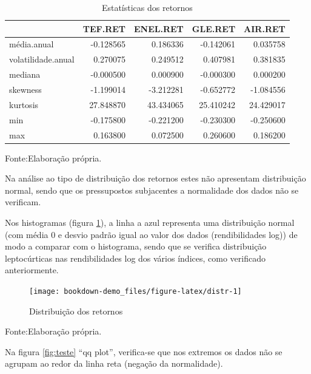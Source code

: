 \documentclass[
  12pt,
  a4paper,
  openany]{book}
\begin{document}
\normalsize

\begin{table}[!h]

\caption{\label{tab:statret}Estatísticas dos retornos}
\centering
\begin{tabular}[t]{lrrrr}
\toprule
  & TEF.RET & ENEL.RET & GLE.RET & AIR.RET\\
\midrule
média.anual & -0.128565 & 0.186336 & -0.142061 & 0.035758\\
volatilidade.anual & 0.270075 & 0.249512 & 0.407981 & 0.381835\\
mediana & -0.000500 & 0.000900 & -0.000300 & 0.000200\\
skewness & -1.199014 & -3.212281 & -0.652772 & -1.084556\\
kurtosis & 27.848870 & 43.434065 & 25.410242 & 24.429017\\
\addlinespace
min & -0.175800 & -0.221200 & -0.230300 & -0.250600\\
max & 0.163800 & 0.072500 & 0.260600 & 0.186200\\
\bottomrule
\end{tabular}
\end{table}
\FloatBarrier
\centering

Fonte:Elaboração própria.

\justifying
\bigskip

Na análise ao tipo de distribuição dos retornos estes não apresentam distribuição normal, sendo que os pressupostos subjacentes a normalidade dos dados não se verificam.

Nos histogramas (figura \ref{fig:distr}), a linha a azul representa uma distribuição normal (com média 0 e desvio padrão igual ao valor dos dados (rendibilidades log)) de modo a comparar com o histograma, sendo que se verifica distribuição leptocúrticas nas rendibilidades log dos vários índices, como verificado anteriormente.

\begin{figure}

{\centering \texttt{[image: bookdown-demo\_files/figure-latex/distr-1]} 

}

\caption{Distribuição dos retornos}\label{fig:distr}
\end{figure}
\FloatBarrier
\centering

Fonte:Elaboração própria.

\justifying

Na figura \ref{fig:teste} ``qq plot'', verifica-se que nos extremos os dados não se agrupam ao redor da linha reta (negação da normalidade).
\end{document}
